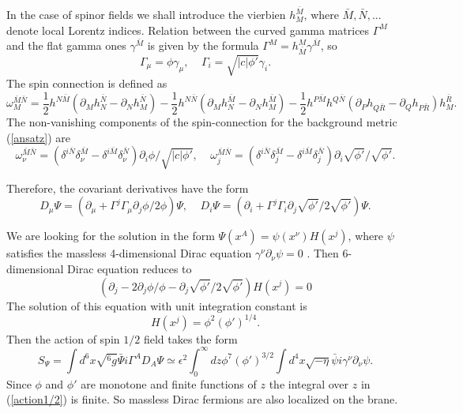 \documentclass[a4paper,a4paper]{article}
\begin{document}
In the case of spinor fields we shall introduce the vierbien
$h^{\bar{M}}_M$, where $\bar{M}, \bar{N}, ...$ denote local
Lorentz indices. Relation between the curved gamma matrices
$\Gamma^M$ and the flat gamma ones $\gamma^{\bar{M}}$ is given by
the formula $\Gamma^M = h^M_{\bar{M}}\gamma^{\bar{M}}$, so
\begin{equation} \label{gamma}
\Gamma_\mu = \phi \gamma_\mu , ~~~~~ \Gamma_i = \sqrt{|c|\phi
'}\gamma_i .
\end{equation}
The spin connection is defined as
\begin{equation} \label{spin1}
\omega^{\bar{M}\bar{N}}_M = \frac{1}{2} h^{N\bar{M}} (\partial_M
h^{\bar{N}}_N - \partial_N h^{\bar{N}}_M) - \frac{1}{2}
h^{N\bar{N}}(\partial_M h^{\bar{M}}_N - \partial_N h^{\bar{M}}_M)
- \frac{1}{2} h^{P\bar{M}}h^{Q\bar{N}}(\partial_P h_{Q\bar{R}} -
\partial_Q h_{P\bar{R}})h^{\bar{R}}_M .
\end{equation}
The non-vanishing components of the spin-connection for the
background metric (\ref{ansatz}) are
\begin{equation} \label{spin2}
\omega^{\bar{M}\bar{N}}_\nu = (\delta^{i\bar{N}}
\delta^{\bar{M}}_\nu - \delta^{i\bar{M}}\delta^{\bar{N}}_\nu
)\partial_i\phi /\sqrt{|c|\phi '} , ~~~~~
\omega^{\bar{M}\bar{N}}_j =
(\delta^{i\bar{N}}\delta^{\bar{M}}_j -
\delta^{i\bar{M}}\delta^{\bar{N}}_j )\partial_i\sqrt{\phi
'}/\sqrt{\phi '}.
\end{equation}

Therefore, the covariant derivatives have the form
\begin{equation} \label{covariant}
D_\mu\Psi = ( \partial_\mu +  \Gamma^j \Gamma_\mu \partial_j\phi
/2\phi) \Psi , ~~~~~ D_i\Psi = (\partial_i +  \Gamma^j \Gamma_i
\partial_j\sqrt{\phi '}/2\sqrt{\phi '}) \Psi .
\end{equation}

We are looking for the solution in the form $\Psi (x^A) = \psi
(x^\nu)H(x^j)$, where $\psi $ satisfies the massless 4-dimensional
Dirac equation $\gamma^\nu \partial_\nu \psi = 0$ . Then
6-dimensional Dirac equation reduces to
\begin{equation} \label{equationH}
\left( \partial_j - 2 \partial_j \phi / \phi - \partial_j
\sqrt{\phi '} / 2 \sqrt{\phi '} \right) H(x^j) = 0
\end{equation}
The solution of this equation with unit integration constant is
\begin{equation} \label{H}
H(x^j) = \phi^2 (\phi ')^{1/4} .
\end{equation}
Then the action of spin $1/2$ field takes the form
\begin{equation} \label{action1/2}
S_\Psi = \int d^6 x \sqrt{^6g}\bar{\Psi} i \Gamma^A D_A \Psi
\simeq \epsilon^2 \int_0^\infty dz \phi^7 (\phi ')^{3/2}\int d^4 x
\sqrt{-\eta } \bar{\psi} i \gamma^\nu
\partial_\nu \psi  .
\end{equation}
Since $\phi $ and $\phi '$ are monotone and finite functions of
$z$ the integral over $z$ in (\ref{action1/2}) is finite. So
massless Dirac fermions are also localized on the brane.
\end{document}
